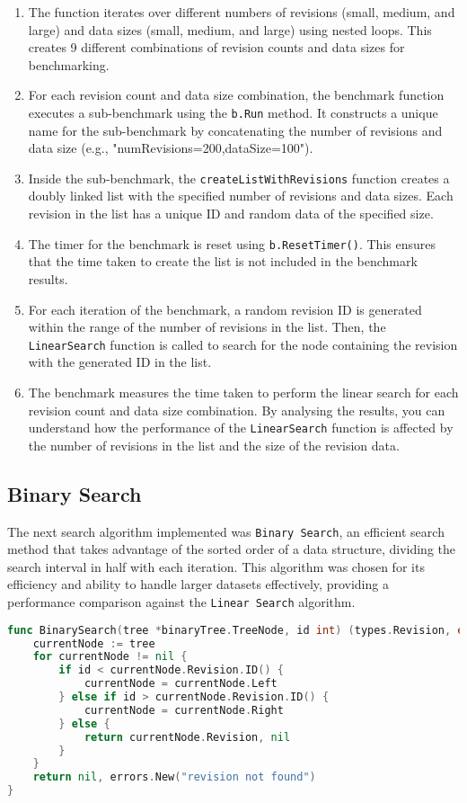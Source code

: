 \begin{enumerate}
    \item The function iterates over different numbers of revisions (small, medium, and large) and data sizes (small, medium, and large) using nested loops. This creates 9 different combinations of revision counts and data sizes for benchmarking.
    \item For each revision count and data size combination, the benchmark function executes a sub-benchmark using the \lstinline{b.Run} method. It constructs a unique name for the sub-benchmark by concatenating the number of revisions and data size (e.g., "numRevisions=200,dataSize=100").
    \item Inside the sub-benchmark, the \lstinline{createListWithRevisions} function creates a doubly linked list with the specified number of revisions and data sizes. Each revision in the list has a unique ID and random data of the specified size.
    \item The timer for the benchmark is reset using \lstinline{b.ResetTimer()}. This ensures that the time taken to create the list is not included in the benchmark results.
    \item For each iteration of the benchmark, a random revision ID is generated within the range of the number of revisions in the list. Then, the \lstinline{LinearSearch} function is called to search for the node containing the revision with the generated ID in the list.
    \item The benchmark measures the time taken to perform the linear search for each revision count and data size combination. By analysing the results, you can understand how the performance of the \lstinline{LinearSearch} function is affected by the number of revisions in the list and the size of the revision data.
\end{enumerate}

\subsection{Binary Search}
The next search algorithm implemented was \lstinline{Binary Search}, an efficient search method that takes advantage of the sorted order of a data structure, dividing the search interval in half with each iteration. This algorithm was chosen for its efficiency and ability to handle larger datasets effectively, providing a performance comparison against the \lstinline{Linear Search} algorithm.

\begin{lstlisting}[language=go]
func BinarySearch(tree *binaryTree.TreeNode, id int) (types.Revision, error) {
	currentNode := tree
	for currentNode != nil {
		if id < currentNode.Revision.ID() {
			currentNode = currentNode.Left
		} else if id > currentNode.Revision.ID() {
			currentNode = currentNode.Right
		} else {
			return currentNode.Revision, nil
		}
	}
	return nil, errors.New("revision not found")
}
\end{lstlisting}
\medskip

